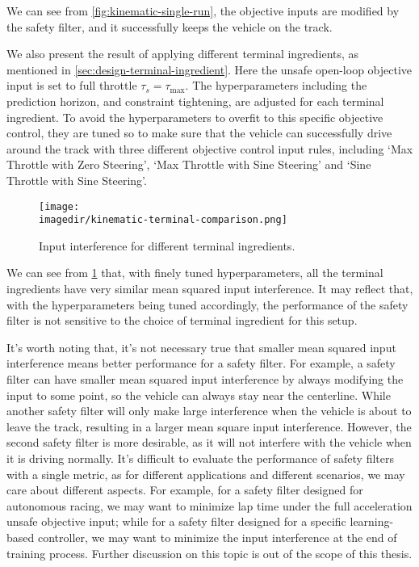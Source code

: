 We can see from \cref{fig:kinematic-single-run}, the objective inputs are modified by the safety filter, and it successfully keeps the vehicle on the track.

We also present the result of applying different terminal ingredients, as mentioned in \cref{sec:design-terminal-ingredient}.
Here the unsafe open-loop objective input is set to full throttle $\tau_s = \tau_{\max}$.
The hyperparameters including the prediction horizon, and constraint tightening, are adjusted for each terminal ingredient.
To avoid the hyperparameters to overfit to this specific objective control, they are tuned so to make sure that the vehicle can successfully drive around the track with three different objective control input rules, including `Max Throttle with Zero Steering', `Max Throttle with Sine Steering' and `Sine Throttle with Sine Steering'.

\begin{figure}[ht]
    \centering
    \texttt{[image: \\imagedir/kinematic-terminal-comparison.png]}
    \caption{Input interference for different terminal ingredients.}
    \label{fig:kinematic-terminal-comparison}
\end{figure}

We can see from \cref{fig:kinematic-terminal-comparison} that, with finely tuned hyperparameters, all the terminal ingredients have very similar mean squared input interference.
It may reflect that, with the hyperparameters being tuned accordingly, the performance of the safety filter is not sensitive to the choice of terminal ingredient for this setup.

It's worth noting that, it's not necessary true that smaller mean squared input interference means better performance for a safety filter.
For example, a safety filter can have smaller mean squared input interference by always modifying the input to some point, so the vehicle can always stay near the centerline.
While another safety filter will only make large interference when the vehicle is about to leave the track, resulting in a larger mean square input interference.
However, the second safety filter is more desirable, as it will not interfere with the vehicle when it is driving normally.
It's difficult to evaluate the performance of safety filters with a single metric, as for different applications and different scenarios, we may care about different aspects.
For example, for a safety filter designed for autonomous racing, we may want to minimize lap time under the full acceleration unsafe objective input; while for a safety filter designed for a specific learning-based controller, we may want to minimize the input interference at the end of training process.
Further discussion on this topic is out of the scope of this thesis.



